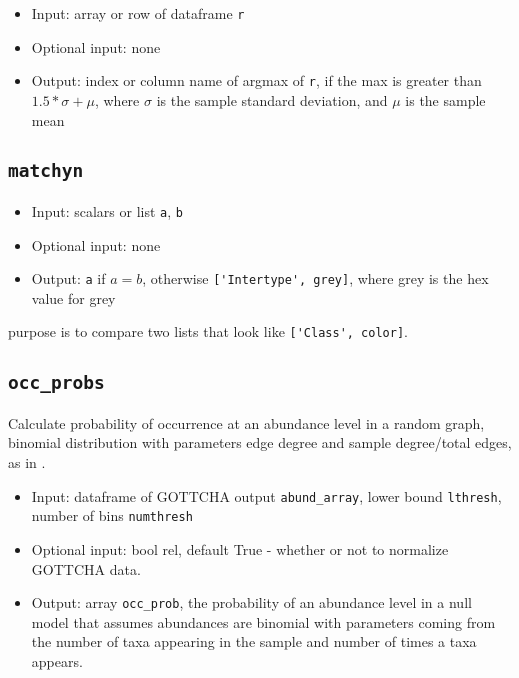 \documentclass[10pt]{article}
\theoremstyle{definition}
\numberwithin{theorem}{section}
\numberwithin{definition}{section}
\numberwithin{lemma}{section}
\numberwithin{corollary}{section}
\numberwithin{clm}{section}
\numberwithin{rmk}{section}
\begin{document}
\begin{itemize}
	\item Input: array or row of dataframe \verb|r|
	\item Optional input: none
	\item Output: index or column name of argmax of \verb|r|, if the max is greater than $1.5*\sigma  + \mu$, where $\sigma$ is the sample standard deviation, and $\mu$ is the sample mean
\end{itemize}

\cprotect \subsection{\verb|matchyn|}

\begin{itemize}
	\item Input: scalars or list \verb|a|, \verb|b|
	\item Optional input: none
	\item Output: \verb|a| if $a = b$, otherwise \verb|['Intertype', grey]|, where grey is the hex value for grey
\end{itemize}

purpose is to compare two lists that look like \verb|['Class', color]|. 

\cprotect \subsection{\verb|occ_probs|}
Calculate probability of occurrence at an abundance level in a random graph, binomial distribution with parameters edge degree and sample degree/total edges, as in \cite{coocc}.

\begin{itemize}
	\item Input: dataframe of GOTTCHA output \verb|abund_array|, lower bound \verb|lthresh|, number of bins \verb|numthresh|
	\item Optional input: bool rel, default True - whether or not to normalize GOTTCHA data.
	\item Output: array \verb|occ_prob|, the probability of an abundance level in a null model that assumes abundances are binomial with parameters coming from the number of taxa appearing in the sample and number of times a taxa appears.
\end{itemize}
\end{document}
